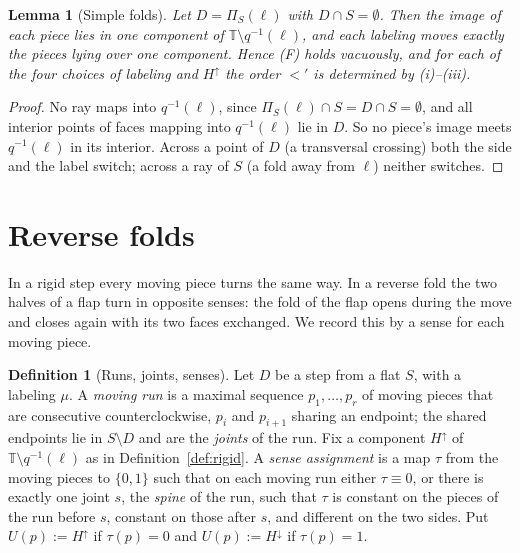 \documentclass[11pt]{amsart}
\newtheorem{lemma}[theorem]{Lemma}
\theoremstyle{definition}
\newtheorem{definition}[theorem]{Definition}
\theoremstyle{remark}
\newcommand{\T}{\mathbb{T}}
\newcommand{\up}{H^{\uparrow}}
\newcommand{\down}{H^{\downarrow}}
\begin{document}
\begin{lemma}[Simple folds]\label{lem:simple}
Let $D=\Pi_S(\ell)$ with $D\cap S=\emptyset$. Then the image of each piece lies in one component
of $\T\setminus q^{-1}(\ell)$, and each labeling moves exactly the pieces lying over one
component. Hence (F) holds vacuously, and for each of the four choices of labeling and $\up$ the order
$<'$ is determined by (i)--(iii).
\end{lemma}
\begin{proof}
No ray maps into $q^{-1}(\ell)$, since $\Pi_S(\ell)\cap S=D\cap S=\emptyset$, and all interior
points of faces mapping into $q^{-1}(\ell)$ lie in $D$. So no piece's image meets $q^{-1}(\ell)$
in its interior. Across a point of $D$ (a transversal crossing) both the side and the label
switch; across a ray of $S$ (a fold away from $\ell$) neither switches.
\end{proof}

\section{Reverse folds}\label{sec:reverse}

In a rigid step every moving piece turns the same way. In a reverse fold the two halves of a flap
turn in opposite senses: the fold of the flap opens during the move and closes again with its two
faces exchanged. We record this by a sense for each moving piece.

\begin{definition}[Runs, joints, senses]\label{def:senses}
Let $D$ be a step from a flat $S$, with a labeling $\mu$. A \emph{moving run} is a maximal sequence
$p_1,\dots,p_r$ of moving pieces that are consecutive counterclockwise, $p_i$ and $p_{i+1}$ sharing
an endpoint; the shared endpoints lie in $S\setminus D$ and are the \emph{joints} of the run. Fix a
component $\up$ of $\T\setminus q^{-1}(\ell)$ as in Definition~\ref{def:rigid}. A \emph{sense
assignment} is a map $\tau$ from the moving pieces to $\{0,1\}$ such that on each moving run either
$\tau\equiv0$, or there is exactly one joint $s$, the \emph{spine} of the run, such that $\tau$ is
constant on the pieces of the run before $s$, constant on those after $s$, and different on the two
sides. Put $U(p):=\up$ if $\tau(p)=0$ and $U(p):=\down$ if $\tau(p)=1$.
\end{definition}
\end{document}
